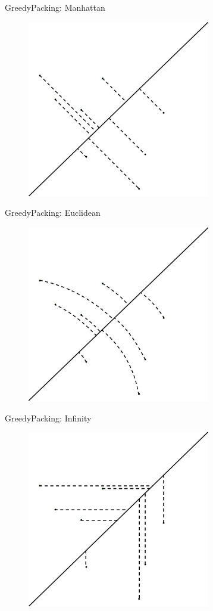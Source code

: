 \documentclass[11pt, british]{beamer}
\begin{document}
\begin{frame}{GreedyPacking: Manhattan}
  \begin{figure}
    \centering
    \includegraphics[width=8cm]{points manhattan.png}
  \end{figure}
\end{frame}

\begin{frame}{GreedyPacking: Euclidean}
  \begin{figure}
    \centering
    \includegraphics[width=8cm]{points euclidean.png}
  \end{figure}
\end{frame}

\begin{frame}{GreedyPacking: Infinity}
  \begin{figure}
    \centering
    \includegraphics[width=8cm]{points infinity.png}
  \end{figure}
\end{frame}
\end{document}
